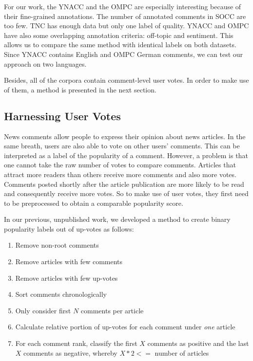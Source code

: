 For our work, the YNACC and the OMPC are especially interesting because of their fine-grained annotations. The number of annotated comments in SOCC are too few. TNC has enough data but only one label of quality. YNACC and OMPC have also some overlapping annotation criteria: off-topic and sentiment. This allows us to compare the same method with identical labels on both datasets. Since YNACC contains English and OMPC German comments, we can test our approach on two languages.

Besides, all of the corpora contain comment-level user votes. In order to make use of them, a method is presented in the next section.

\subsection{Harnessing User Votes}
\label{sec:data_votes}

News comments allow people to express their opinion about news articles. In the same breath, users are also able to vote on other users' comments. This can be interpreted as a label of the popularity of a comment. However, a problem is that one cannot take the raw number of votes to compare comments. Articles that attract more readers than others receive more comments and also more votes. Comments posted shortly after the article publication are more likely to be read and consequently receive more votes. So to make use of user votes, they first need to be preprocessed to obtain a comparable popularity score. 

In our previous, unpublished work, we developed a method to create binary popularity labels out of up-votes as follows:

\begin{enumerate}
\item Remove non-root comments
\item Remove articles with few comments 
\item Remove articles with few up-votes
\item Sort comments chronologically
\item Only consider first $N$ comments per article
\item Calculate relative portion of up-votes for each comment under \textit{one} article
\item For each comment rank, classify the first $X$ comments as positive and the last $X$ comments as negative, whereby $X * 2 <= $ number of articles
\end{enumerate}

